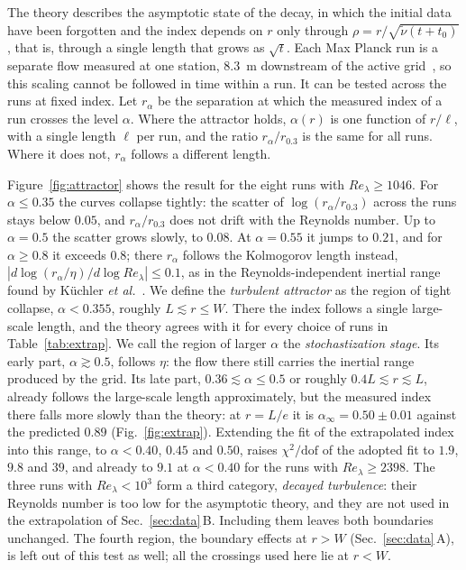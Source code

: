 \documentclass[aip,pof,preprint,floatfix,nofootinbib,amsmath,amssymb]{revtex4-2}
\begin{document}
The theory describes the asymptotic state of the decay, in which the initial data have been forgotten and the index depends
on $r$ only through $\rho=r/\sqrt{\tilde\nu(t+t_0)}$, that is, through a single length that grows as $\sqrt t$. Each Max
Planck run is a separate flow measured at one station, $8.3$~m downstream of the active grid~\cite{GregXi2}, so this scaling
cannot be followed in time within a run. It can be tested across the runs at fixed index. Let $r_\alpha$ be the separation
at which the measured index of a run crosses the level $\alpha$. Where the attractor holds, $\alpha(r)$ is one function of
$r/\ell$, with a single length $\ell$ per run, and the ratio $r_\alpha/r_{0.3}$ is the same for all runs. Where it does not,
$r_\alpha$ follows a different length.

Figure~\ref{fig:attractor} shows the result for the eight runs with $Re_\lambda\ge1046$. For $\alpha\le0.35$ the curves
collapse tightly: the scatter of $\log(r_\alpha/r_{0.3})$ across the runs stays below $0.05$, and $r_\alpha/r_{0.3}$ does not
drift with the Reynolds number. Up to $\alpha=0.5$ the scatter grows slowly, to $0.08$. At $\alpha=0.55$ it jumps to $0.21$,
and for $\alpha\ge0.8$ it exceeds $0.8$; there $r_\alpha$ follows the Kolmogorov length instead,
$|d\log(r_\alpha/\eta)/d\log Re_\lambda|\le0.1$, as in the Reynolds-independent inertial range found by Küchler
\emph{et al.}~\cite{GregXi2}. We define the \emph{turbulent attractor} as the region of tight collapse, $\alpha<0.355$, roughly
$L\lesssim r\le W$. There the index follows a single large-scale length, and the theory agrees with it for every choice of runs in
Table~\ref{tab:extrap}. We call the region of larger $\alpha$ the \emph{stochastization stage}. Its early part, $\alpha\gtrsim0.5$,
follows $\eta$: the flow there still carries the inertial range produced by the grid. Its late part, $0.36\lesssim\alpha\le0.5$
or roughly $0.4L\lesssim r\lesssim L$, already follows the large-scale length approximately, but the measured index there falls
more slowly than the theory: at $r=L/e$ it is $\alpha_\infty=0.50\pm0.01$ against the predicted $0.89$ (Fig.~\ref{fig:extrap}).
Extending the fit of the extrapolated index into this range, to $\alpha<0.40$, $0.45$ and $0.50$, raises $\chi^2/\mathrm{dof}$
of the adopted fit to $1.9$, $9.8$ and $39$, and already to $9.1$ at $\alpha<0.40$ for the runs with $Re_\lambda\ge2398$. The
three runs with $Re_\lambda<10^3$ form a third category, \emph{decayed turbulence}: their Reynolds number is too low for the
asymptotic theory, and they are not used in the extrapolation of Sec.~\ref{sec:data}\,B. Including them leaves both boundaries
unchanged. The fourth region, the boundary effects at $r>W$ (Sec.~\ref{sec:data}\,A), is left out of this test as well; all
the crossings used here lie at $r<W$.
\end{document}
